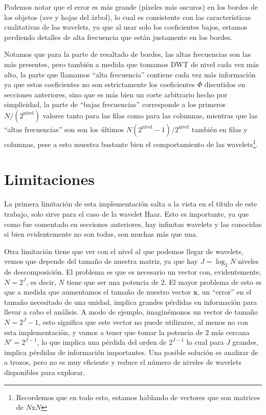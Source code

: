 \documentclass[conference]{IEEEtran}
\begin{document}
Podemos notar que el error es más grande (píxeles más oscuros) en los bordes de los objetos (ave y hojas del árbol), lo cual es consistente con las características cualitativas de las wavelets, ya que al usar solo los coeficientes bajos, estamos perdiendo detalles de alta frecuencia que están justamente en los bordes.

Notamos que para la parte de resaltado de bordes, las altas frecuencias son las más presentes, pero también a medida que tomamos DWT de nivel cada vez más alto, la parte que llamamos ``alta frecuencia'' contiene cada vez más información ya que estos coeficientes no son estrictamente los coeficientes $\Phi$ discutidos en secciones anteriores, sino que es más bien un corte arbitrario hecho por simplicidad, la parte de ``bajas frecuencias'' corresponde a los primeros $N/(2^\text{nivel})$ valores tanto para las filas como para las columnas, mientras que las ``altas frecuencias'' son son los últimos $N(2^\text{nivel}-1)/2^\text{nivel}$ también en filas y columnas, pese a esto muestra bastante bien el comportamiento de las wavelets\footnote{Recordemos que en todo esto, estamos hablando de vectores que son matrices de $N\text{x}N$}.

\section{Limitaciones}

La primera limitación de esta implementación salta a la vista en el título de este trabajo, solo sirve para el caso de la wavelet Haar. Esto es importante, ya que como fue comentado en secciones anteriores, hay infinitas wavelets y las conocidas si bien evidentemente no son todas, son muchas más que una.

Otra limitación tiene que ver con el nivel al que podemos llegar de wavelets, vemos que depende del tamaño de nuestra matriz, ya que hay $J = \log_2 N$ niveles de descomposición. El problema es que es necesario un vector con, evidentemente, $N=2^J$, es decir, $N$ tiene que ser una potencia de $2$. El mayor problema de esto es que a medida que aumentamos el tamaño de nuestro vector $\pmb{x}$, un ``error'' en el tamaño necesitado de una unidad, implica grandes pérdidas en información para llevar a cabo el análisis. A modo de ejemplo, imaginémonos un vector de tamaño $N=2^J-1$, esto significa que este vector no puede utilizarse, al menos no con esta implementación, y vamos a tener que tomar la potencia de 2 más cercana $N'=2^{J-1}$, lo que implica una pérdida del orden de $2^{J-1}$ lo cual para $J$ grandes, implica pérdidas de información importantes. Una posible solución es analizar de a trozos, pero no es muy eficiente y reduce el número de niveles de wavelets disponibles para explorar.
\end{document}
